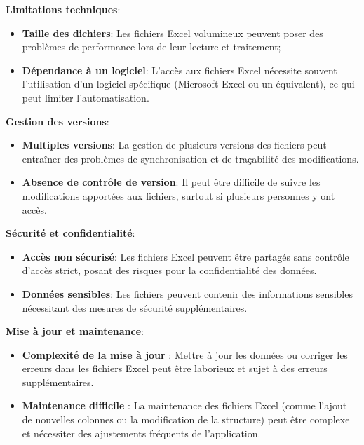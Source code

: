 \noindent \textbf{Limitations techniques}:
\begin{itemize}
    \item \textbf{Taille des dichiers}: Les fichiers Excel volumineux peuvent poser des problèmes de performance lors de leur lecture et traitement;
    \item \textbf{Dépendance à un logiciel}: L'accès aux fichiers Excel nécessite souvent l'utilisation d'un logiciel spécifique (Microsoft Excel ou un équivalent), ce qui peut limiter l'automatisation.
\end{itemize}
\clearpage
\noindent \textbf{Gestion des versions}:
\begin{itemize}
    \item \textbf{Multiples versions}: La gestion de plusieurs versions des fichiers peut entraîner des problèmes de synchronisation et de traçabilité des modifications.
    \item \textbf{Absence de contrôle de version}: Il peut être difficile de suivre les modifications apportées aux fichiers, surtout si plusieurs personnes y ont accès.
\end{itemize}
\vspace{.4cm}
\noindent \textbf{Sécurité et confidentialité}:
\begin{itemize}
    \item \textbf{Accès non sécurisé}: Les fichiers Excel peuvent être partagés sans contrôle d'accès strict, posant des risques pour la confidentialité des données.
    \item \textbf{Données sensibles}: Les fichiers peuvent contenir des informations sensibles nécessitant des mesures de sécurité supplémentaires.
\end{itemize}
\vspace{.4cm}


\vspace{.4cm}
\noindent \textbf{Mise à jour et maintenance}:
\begin{itemize}
    \item\textbf{Complexité de la mise à jour} : Mettre à jour les données ou corriger les erreurs dans les fichiers Excel peut être laborieux et sujet à des erreurs supplémentaires.
    \item \textbf{Maintenance difficile} : La maintenance des fichiers Excel (comme l'ajout de nouvelles colonnes ou la modification de la structure) peut être complexe et nécessiter des ajustements fréquents de l'application.
\end{itemize}
\vspace{.4cm}

